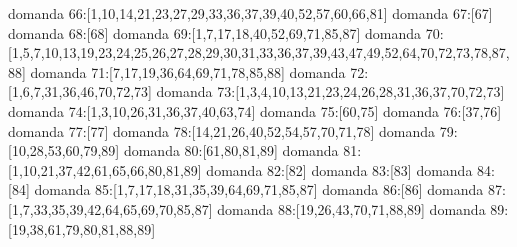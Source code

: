 domanda 66:[1,10,14,21,23,27,29,33,36,37,39,40,52,57,60,66,81]
domanda 67:[67]
domanda 68:[68]
domanda 69:[1,7,17,18,40,52,69,71,85,87]
domanda 70:[1,5,7,10,13,19,23,24,25,26,27,28,29,30,31,33,36,37,39,43,47,49,52,64,70,72,73,78,87,88]
domanda 71:[7,17,19,36,64,69,71,78,85,88]
domanda 72:[1,6,7,31,36,46,70,72,73]
domanda 73:[1,3,4,10,13,21,23,24,26,28,31,36,37,70,72,73]
domanda 74:[1,3,10,26,31,36,37,40,63,74]
domanda 75:[60,75]
domanda 76:[37,76]
domanda 77:[77]
domanda 78:[14,21,26,40,52,54,57,70,71,78]
domanda 79:[10,28,53,60,79,89]
domanda 80:[61,80,81,89]
domanda 81:[1,10,21,37,42,61,65,66,80,81,89]
domanda 82:[82]
domanda 83:[83]
domanda 84:[84]
domanda 85:[1,7,17,18,31,35,39,64,69,71,85,87]
domanda 86:[86]
domanda 87:[1,7,33,35,39,42,64,65,69,70,85,87]
domanda 88:[19,26,43,70,71,88,89]
domanda 89:[19,38,61,79,80,81,88,89]